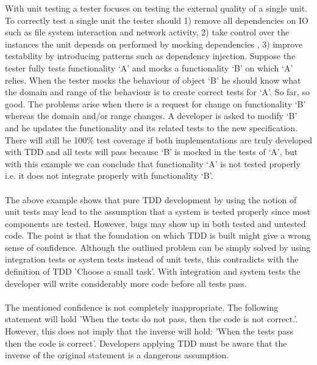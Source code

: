 \begin{itshape}
\begin{addmargin}[1em]{1em}
With unit testing a tester focuses on testing the external quality of a single unit.
To correctly test a single unit the tester should
1) remove all dependencies on IO such as file system interaction and network activity,
2) take control over the instances the unit depends on performed by mocking dependencies \autocite{XP_EXAMINED},
3) improve testability by introducing patterns such as dependency injection.
Suppose the tester fully tests functionality `A' and mocks a functionality `B' on which `A' relies.
When the tester mocks the behaviour of object `B' he should know what the domain and range of the behaviour is to create correct tests for `A'.
So far, so good.
The problems arise when there is a request for change on functionality `B' whereas the domain and/or range changes.
A developer is asked to modify `B' and he updates the functionality and its related tests to the new specification.
There will still be 100\% test coverage if both implementations are truly developed with TDD and all tests will pass because `B' is mocked in the tests of `A',
but with this example we can conclude that functionality `A' is not tested properly i.e. it does not integrate properly with functionality `B'.
\end{addmargin}
\end{itshape}

\paragraph{}
The above example shows that pure TDD development by using the notion of unit tests may lead to the assumption that a system is tested properly since most components are tested.
However, bugs may show up in both tested and untested code.
The point is that the foundation on which TDD is built might give a wrong sense of confidence.
Although the outlined problem can be simply solved by using integration tests or system tests instead of unit tests, this contradicts with the definition of TDD 'Choose a small task'.
With integration and system tests the developer will write considerably more code before all tests pass.

\paragraph{}
The mentioned confidence is not completely inappropriate.
The following statement will hold 'When the tests do not pass, then the code is not correct.'.
However, this does not imply that the inverse will hold: 'When the tests pass then the code is correct'.
Developers applying TDD must be aware that the inverse of the original statement is a dangerous assumption.

